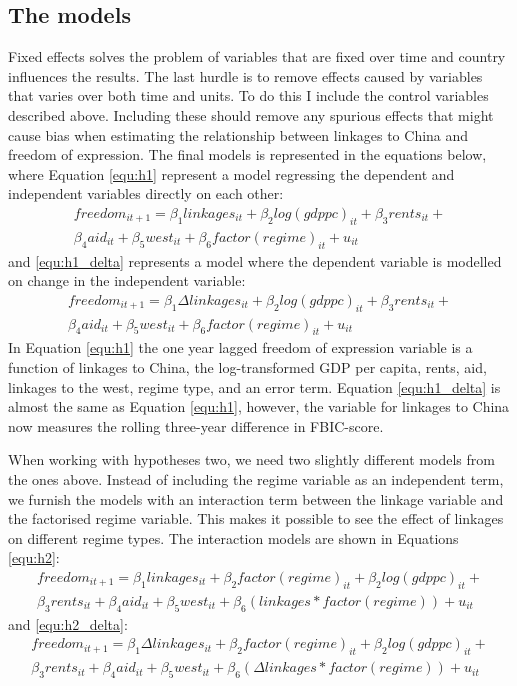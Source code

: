 \subsection{The models}
Fixed effects solves the problem of variables that are fixed over time and country influences the results. The last hurdle is to remove effects caused by variables that varies over both time and units. To do this I include the control variables described above. Including these should remove any spurious effects that might cause bias when estimating the relationship between linkages to China and freedom of expression. The final models is represented in the equations below, where Equation \ref{equ:h1} represent a model regressing the dependent and independent variables directly on each other:
\begin{multline} \label{equ:h1}
    freedom_{it+1} = \beta_1  linkages_{it} + \beta_2 log(gdppc)_{it} + \beta_3 rents_{it} + \\\beta_4aid_{it} + \beta_5 west_{it} + \beta_6  factor(regime)_{it} + u_{it}
\end{multline}
and \ref{equ:h1_delta} represents a model where the dependent variable is modelled on change in the independent variable:
\begin{multline} \label{equ:h1_delta}
    freedom_{it+1} = \beta_1 \Delta linkages_{it} + \beta_2 log(gdppc)_{it} + \beta_3rents_{it} + \\\beta_4aid_{it} + \beta_5west_{it} + \beta_6 factor(regime)_{it} + u_{it}
\end{multline}
In Equation \ref{equ:h1} the one year lagged freedom of expression variable is a function of  linkages to China, the log-transformed GDP per capita, rents, aid, linkages to the west, regime type, and an error term. Equation \ref{equ:h1_delta}
is almost the same as Equation \ref{equ:h1}, however, the variable for linkages to China now measures the rolling three-year difference in FBIC-score. 

When working with hypotheses two, we need two slightly different models from the ones above. Instead of including the regime variable as an independent term, we furnish the models with an interaction term between the linkage variable and the factorised regime variable. This makes it possible to see the effect of linkages on different regime types. The interaction models are shown in Equations \ref{equ:h2}:
\begin{multline} \label{equ:h2}
    freedom_{it+1} = \beta_1 linkages_{it} + \beta_2 factor(regime)_{it} + \beta_2 log(gdppc)_{it} + \\ \beta_3 rents_{it} + \beta_4 aid_{it} + \beta_5 west_{it} + \beta_6 (linkages * factor(regime)) + u_{it}
\end{multline}
and \ref{equ:h2_delta}:
\begin{multline} \label{equ:h2_delta}
    freedom_{it+1} = \beta_1 \Delta linkages_{it} + \beta_2 factor(regime)_{it} + \beta_2 log(gdppc)_{it} + \\ \beta_3 rents_{it} + \beta_4 aid_{it} + \beta_5 west_{it} + \beta_6 (\Delta linkages * factor(regime)) + u_{it}
\end{multline}